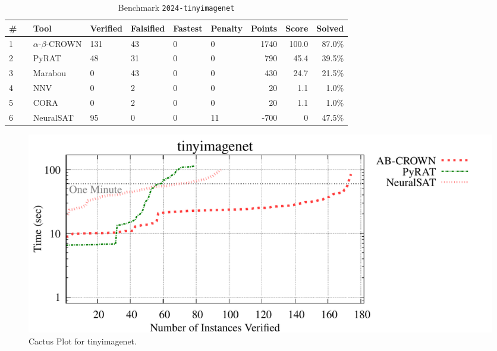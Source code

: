 \begin{table}[h]
\begin{center}
\caption{Benchmark \texttt{2024-tinyimagenet}} \label{tab:cat_{cat}}
{\setlength{\tabcolsep}{2pt}
\begin{tabular}[h]{@{}llllllrrr@{}}
\toprule
\textbf{\# ~} & \textbf{Tool} & \textbf{Verified} & \textbf{Falsified} & \textbf{Fastest} & \textbf{Penalty} & \textbf{Points} & \textbf{Score} & \textbf{Solved}\\
\midrule
1 & $\alpha$-$\beta$-CROWN & 131 & 43 & 0 & 0 & 1740 & 100.0 & 87.0\% \\
2 & PyRAT & 48 & 31 & 0 & 0 & 790 & 45.4 & 39.5\% \\
3 & Marabou & 0 & 43 & 0 & 0 & 430 & 24.7 & 21.5\% \\
4 & NNV & 0 & 2 & 0 & 0 & 20 & 1.1 & 1.0\% \\
5 & CORA & 0 & 2 & 0 & 0 & 20 & 1.1 & 1.0\% \\
6 & NeuralSAT & 95 & 0 & 0 & 11 & -700 & 0 & 47.5\% \\
\bottomrule
\end{tabular}
}
\end{center}
\end{table}



\begin{figure}[h]
\centerline{\includegraphics[width=\textwidth]{cactus/2024_tinyimagenet.pdf}}
\caption{Cactus Plot for tinyimagenet.}
\label{fig:quantPic}
\end{figure}


\clearpage

